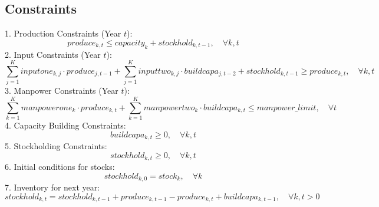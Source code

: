 \documentclass{article}
\begin{document}
\subsection*{Constraints}
1. Production Constraints (Year \( t \)):
\[
produce_{k,t} \leq capacity_{k} + stockhold_{k,t-1}, \quad \forall k, t
\]
2. Input Constraints (Year \( t \)):
\[
\sum_{j=1}^{K} inputone_{k,j} \cdot produce_{j,t-1} + \sum_{j=1}^{K} inputtwo_{k,j} \cdot buildcapa_{j,t-2} + stockhold_{k,t-1} \geq produce_{k,t}, \quad \forall k, t
\]
3. Manpower Constraints (Year \( t \)):
\[
\sum_{k=1}^{K} manpowerone_{k} \cdot produce_{k,t} + \sum_{k=1}^{K} manpowertwo_{k} \cdot buildcapa_{k,t} \leq manpower\_limit, \quad \forall t
\]
4. Capacity Building Constraints:
\[
buildcapa_{k,t} \geq 0, \quad \forall k, t
\]
5. Stockholding Constraints:
\[
stockhold_{k,t} \geq 0, \quad \forall k, t
\]
6. Initial conditions for stocks:
\[
stockhold_{k,0} = stock_{k}, \quad \forall k
\]
7. Inventory for next year:
\[
stockhold_{k,t} = stockhold_{k,t-1} + produce_{k,t-1} - produce_{k,t} + buildcapa_{k,t-1}, \quad \forall k, t > 0
\]
\end{document}
